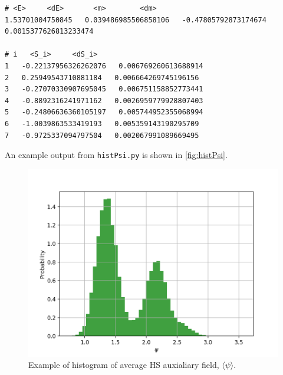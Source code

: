 \documentclass[11pt]{article}
\begin{document}
{\tiny
\begin{lstlisting}
# <E>     <dE>       <m>        <dm>
1.53701004750845   0.039486985506858106   -0.47805792873174674   0.0015377626813233474

# i   <S_i>     <dS_i>
1   -0.22137956326262076   0.006769260613688914
2   0.25949543710881184   0.006664269745196156
3   -0.27070330907695045   0.006751158852773441
4   -0.8892316241971162   0.0026959779928807403
5   -0.24806636360105197   0.005744952355068994
6   -1.0039863533419193   0.005359143190295709
7   -0.9725337094797504   0.002067991089669495
\end{lstlisting}}\noindent
An example output from \texttt{histPsi.py} is shown in \autoref{fig:histPsi}.
\begin{figure}
\center
\includegraphics[width=.8\columnwidth]{figures/histPsi.png}
\caption{Example of histogram of average HS auxialiary field, $\langle \psi\rangle$. \label{fig:histPsi}}
\end{figure}
\end{document}
